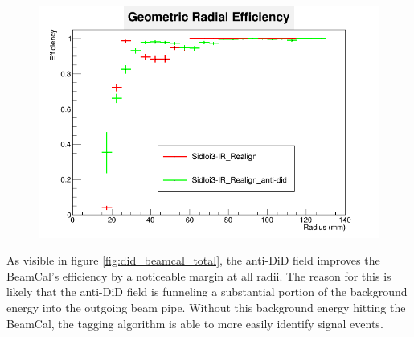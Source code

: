 \documentclass{report}
\begin{document}
                \begin{figure}[H]
                    \includegraphics[width=\textwidth]{RadialEfficiency_geometric_did}
                    \centering
                    \caption{}
                    \label{fig:did_beamcal_geom}
                \end{figure}

                As visible in figure \ref{fig:did_beamcal_total}, the anti-DiD field improves the BeamCal's efficiency by a noticeable margin at all radii. The reason for this is likely that the anti-DiD field is funneling a substantial portion of the background energy into the outgoing beam pipe. Without this background energy hitting the BeamCal, the tagging algorithm is able to more easily identify signal events.
\end{document}
